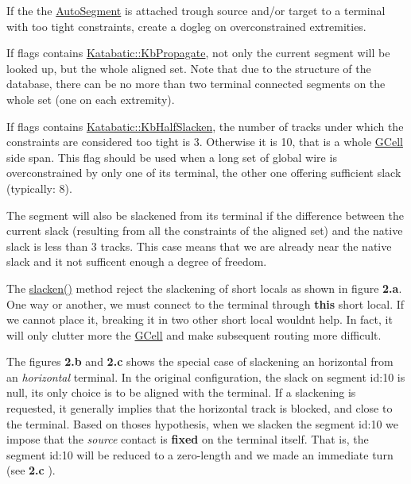 If the the \hyperlink{classKatabatic_1_1AutoSegment}{Auto\+Segment} is attached trough source and/or target to a terminal with too tight constraints, create a dogleg on overconstrained extremities.

If {\ttfamily flags} contains \hyperlink{namespaceKatabatic_a2af2ad6b6441614038caf59d04b3b217a3f95c1f06fe0b58b44ccbc57d99f2a5d}{Katabatic\+::\+Kb\+Propagate}, not only the current segment will be looked up, but the whole aligned set. Note that due to the structure of the database, there can be no more than two terminal connected segments on the whole set (one on each extremity).

If {\ttfamily flags} contains \hyperlink{namespaceKatabatic_a2af2ad6b6441614038caf59d04b3b217a1d6ccf82d04758a0922270d4f469066a}{Katabatic\+::\+Kb\+Half\+Slacken}, the number of tracks under which the constraints are considered too tight is 3. Otherwise it is 10, that is a whole \hyperlink{classKatabatic_1_1GCell}{G\+Cell} side span. This flag should be used when a long set of global wire is overconstrained by only one of it\textquotesingle{}s terminal, the other one offering sufficient slack (typically\+: 8).

The segment will also be slackened from it\textquotesingle{}s terminal if the difference between the current slack (resulting from all the constraints of the aligned set) and the native slack is less than 3 tracks. This case means that we are already near the native slack and it not sufficent enough a degree of freedom.

 The {\ttfamily \hyperlink{classKatabatic_1_1AutoSegment_a1fbc0adb4c0b14632edc7c55f028cd4b}{slacken()}} method reject the slackening of short locals as shown in figure {\bfseries 2.\+a}. One way or another, we must connect to the terminal through {\bfseries this} short local. If we cannot place it, breaking it in two other short local wouldn\textquotesingle{}t help. In fact, it will only clutter more the \hyperlink{classKatabatic_1_1GCell}{G\+Cell} and make subsequent routing more difficult.

The figures {\bfseries 2.\+b} and {\bfseries 2.\+c} shows the special case of slackening an horizontal from an {\itshape horizontal} terminal. In the original configuration, the slack on segment {\ttfamily id\+:10} is null, it\textquotesingle{}s only choice is to be aligned with the terminal. If a slackening is requested, it generally implies that the horizontal track is blocked, and close to the terminal. Based on thoses hypothesis, when we slacken the segment {\ttfamily id\+:10} we impose that the {\itshape source} contact is {\bfseries fixed} on the terminal itself. That is, the segment {\ttfamily id\+:10} will be reduced to a zero-\/length and we made an immediate turn (see {\bfseries 2.\+c} ).

